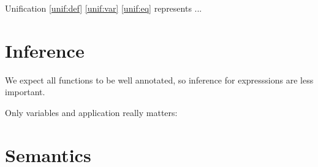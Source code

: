 \documentclass{article}
\begin{document}
Unification \ref{unif:def} \ref{unif:var} \ref{unif:eq} represents ...

\section{Inference}

We expect all functions to be well annotated, so inference for expresssions are less important.

Only variables and application really matters:

\begin{prooftree}
\end{prooftree}

\begin{prooftree}
\end{prooftree}



\section{Semantics}
\end{document}
